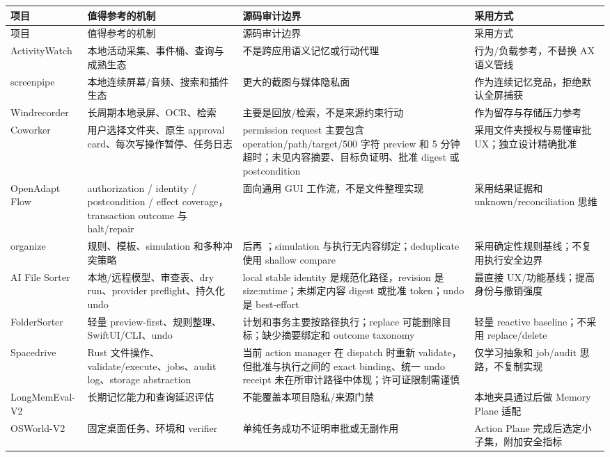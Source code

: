 \documentclass[UTF8,fontset=none,zihao=-4,openany]{ctexrep}
\newcommand{\code}[1]{\texttt{\detokenize{#1}}}
\begin{document}
\small
\begin{longtable}{p{26mm}p{40mm}p{51mm}p{36mm}}
\toprule
项目 & 值得参考的机制 & 源码审计边界 & 采用方式 \\
\midrule
\endfirsthead
\toprule
项目 & 值得参考的机制 & 源码审计边界 & 采用方式 \\
\midrule
\endhead
ActivityWatch & 本地活动采集、事件桶、查询与成熟生态 & 不是跨应用语义记忆或行动代理 & 行为/负载参考，不替换 AX 语义管线 \\
screenpipe & 本地连续屏幕/音频、搜索和插件生态 & 更大的截图与媒体隐私面 & 作为连续记忆竞品，拒绝默认全屏捕获 \\
Windrecorder & 长周期本地录屏、OCR、检索 & 主要是回放/检索，不是来源约束行动 & 作为留存与存储压力参考 \\
Coworker & 用户选择文件夹、原生 approval card、每次写操作暂停、任务日志 & permission request 主要包含 operation/path/target/500 字符 preview 和 5 分钟超时；未见内容摘要、目标负证明、批准 digest 或 postcondition & 采用文件夹授权与易懂审批 UX；独立设计精确批准 \\
OpenAdapt Flow & authorization / identity / postcondition / effect coverage，transaction outcome 与 halt/repair & 面向通用 GUI 工作流，不是文件整理实现 & 采用结果证据和 unknown/reconciliation 思维 \\
organize & 规则、模板、simulation 和多种冲突策略 & \code{resolve_conflict()} 后再 \code{shutil.move()}；simulation 与执行无内容绑定；deduplicate 使用 shallow compare & 采用确定性规则基线；不复用执行安全边界 \\
AI File Sorter & 本地/远程模型、审查表、dry run、provider preflight、持久化 undo & local stable identity 是规范化路径，revision 是 size:mtime；未绑定内容 digest 或批准 token；undo 是 best-effort & 最直接 UX/功能基线；提高身份与撤销强度 \\
FolderSorter & 轻量 preview-first、规则整理、SwiftUI/CLI、undo & 计划和事务主要按路径执行；replace 可能删除目标；缺少摘要绑定和 outcome taxonomy & 轻量 reactive baseline；不采用 replace/delete \\
Spacedrive & Rust 文件操作、validate/execute、jobs、audit log、storage abstraction & 当前 action manager 在 dispatch 时重新 validate，但批准与执行之间的 exact binding、统一 undo receipt 未在所审计路径中体现；许可证限制需谨慎 & 仅学习抽象和 job/audit 思路，不复制实现 \\
LongMemEval-V2 & 长期记忆能力和查询延迟评估 & 不能覆盖本项目隐私/来源门禁 & 本地夹具通过后做 Memory Plane 适配 \\
OSWorld-V2 & 固定桌面任务、环境和 verifier & 单纯任务成功不证明审批或无副作用 & Action Plane 完成后选定小子集，附加安全指标 \\
\bottomrule
\end{longtable}
\normalsize
\end{document}
